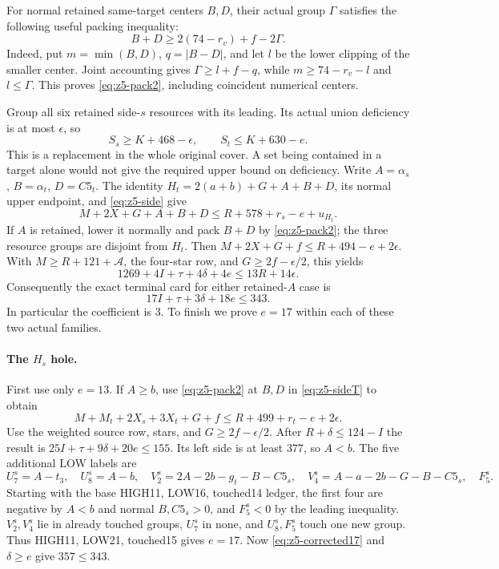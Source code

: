 \documentclass[11pt,letterpaper]{article}
\theoremstyle{definition}\newtheorem{definition}[theorem]{Definition}
\begin{document}
For normal retained same-target centers $B,D$, their actual group
$\Gamma$ satisfies the following useful packing inequality:
\begin{equation}\label{eq:z5-pack2}
 B+D\ge2(74-r_v)+f-2\Gamma.
\end{equation}
Indeed, put $m=\min(B,D)$, $q=|B-D|$, and let $l$ be the lower
clipping of the smaller center. Joint accounting gives
$\Gamma\ge l+f-q$, while $m\ge74-r_v-l$ and $l\le\Gamma$.
This proves \eqref{eq:z5-pack2}, including coincident numerical centers.

Group all six retained side-$s$ resources with its leading. Its actual
union deficiency is at most $\epsilon$, so
\begin{equation}\label{eq:z5-side}
 S_s\ge K+468-\epsilon,\qquad S_t\le K+630-e.
\end{equation}
This is a replacement in the whole original cover. A set being contained
in a target alone would not give the required upper bound on deficiency.
Write $A=\alpha_s$, $B=\alpha_t$, $D=C5_t$.
The identity $H_t=2(a+b)+G+A+B+D$, its normal upper endpoint, and
\eqref{eq:z5-side} give
\begin{equation}\label{eq:z5-sideT}
 M+2X+G+A+B+D\le R+578+r_s-e+u_{H_t}.
\end{equation}
If $A$ is retained, lower it normally and pack $B+D$ by
\eqref{eq:z5-pack2}; the three resource groups are disjoint from $H_t$.
Then
$M+2X+G+f\le R+494-e+2\epsilon$.
With $M\ge R+121+\mathcal A$, the four-star row, and
$G\ge2f-\epsilon/2$, this yields
\[
 1269+4I+\tau+4\delta+4e\le13R+14\epsilon.
\]
Consequently the exact terminal card for either retained-$A$ case is
\begin{equation}\label{eq:z5-corrected17}
 \boxed{17I+\tau+3\delta+18e\le343.}
\end{equation}
In particular the coefficient is $3$. To finish we prove $e=17$ within
each of these two actual families.

\paragraph{The $H_s$ hole.}
First use only $e=13$. If $A\ge b$, use
\eqref{eq:z5-pack2} at $B,D$ in \eqref{eq:z5-sideT} to obtain
\[
 M+M_t+2X_s+3X_t+G+f\le R+499+r_t-e+2\epsilon.
\]
Use the weighted source row, stars, and $G\ge2f-\epsilon/2$.
After $R+\delta\le124-I$ the result is
$25I+\tau+9\delta+20e\le155$.
Its left side is at least $377$, so $A<b$.
The five additional LOW labels are
\[
 U_7^s=A-t_3,\quad U_8^s=A-b,\quad
 V_2^s=2A-2b-g_t-B-C5_s,\quad
 V_4^s=A-a-2b-G-B-C5_s,\quad F_5^s.
\]
Starting with the base HIGH11, LOW16, touched14 ledger, the first four
are negative by $A<b$ and normal $B,C5_s>0$, and $F_5^s<0$ by the
leading inequality. $V_2^s,V_4^s$ lie in already touched groups,
$U_7^s$ in none, and $U_8^s,F_5^s$ touch one new group.
Thus HIGH11, LOW21, touched15 gives $e=17$.
Now \eqref{eq:z5-corrected17} and $\delta\ge e$ give $357\le343$.
\end{document}
